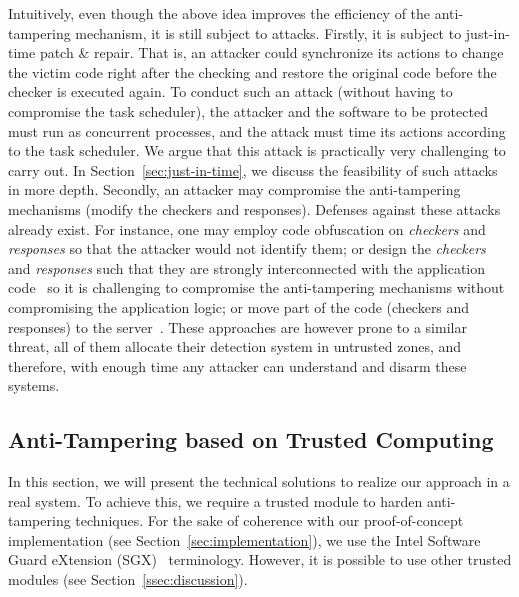 Intuitively, even though the above idea improves the efficiency of the 
anti-tampering mechanism, it is still subject to attacks. Firstly, it is 
subject to just-in-time patch \& repair. That is, an attacker could synchronize 
its actions to change the victim code right after the checking and restore the 
original code before the checker is executed again.
To conduct such an attack (without having to compromise the task scheduler), 
the attacker and the software to be protected must run as concurrent processes, 
and the attack must time its actions according to the task scheduler.
We argue that this attack is practically very challenging to carry out.
In Section~\ref{sec:just-in-time}, we discuss the feasibility of such attacks 
in more depth.
Secondly, an attacker may compromise the anti-tampering mechanisms (\ie modify 
the checkers and responses). 
Defenses against these attacks already exist.
For instance, one may employ code obfuscation on \emph{checkers} and 
\emph{responses} so that the attacker would not identify them; or design the 
\emph{checkers} and \emph{responses} such that they are strongly interconnected 
with the application code~\cite{biondi2006silver} so it is challenging to 
compromise the anti-tampering mechanisms without compromising the application 
logic; or move part of the code (\eg checkers and responses) to the 
server~\cite{viticchie2016reactive}.
These approaches are however prone to a similar threat, \ie all of them 
allocate their detection system in untrusted zones, 
and therefore, with enough time any attacker can understand and disarm these 
systems.

\subsection{Anti-Tampering based on Trusted Computing}

In this section, we will present the technical solutions to realize our 
approach in a real system.
To achieve this, we require a trusted module to harden anti-tampering 
techniques.
For the sake of coherence with our proof-of-concept implementation (see 
Section~\ref{sec:implementation}), we use the Intel Software Guard eXtension 
(SGX)~\cite{rozas2013intel} terminology.
However, it is possible to use other trusted modules (see 
Section~\ref{ssec:discussion}).

